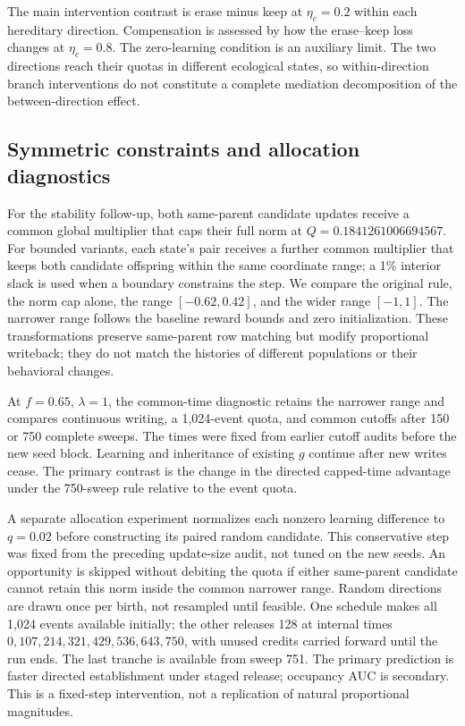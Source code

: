 \documentclass[11pt]{article}
\begin{document}
The main intervention contrast is erase minus keep at $\eta_c=0.2$ within each hereditary direction. Compensation is assessed by how the erase--keep loss changes at $\eta_c=0.8$. The zero-learning condition is an auxiliary limit. The two directions reach their quotas in different ecological states, so within-direction branch interventions do not constitute a complete mediation decomposition of the between-direction effect.

\subsection{Symmetric constraints and allocation diagnostics}
For the stability follow-up, both same-parent candidate updates receive a common global multiplier that caps their full norm at $Q=0.1841261006694567$. For bounded variants, each state's pair receives a further common multiplier that keeps both candidate offspring within the same coordinate range; a 1\% interior slack is used when a boundary constrains the step. We compare the original rule, the norm cap alone, the range $[-0.62,0.42]$, and the wider range $[-1,1]$. The narrower range follows the baseline reward bounds and zero initialization. These transformations preserve same-parent row matching but modify proportional writeback; they do not match the histories of different populations or their behavioral changes.

At $f=0.65$, $\lambda=1$, the common-time diagnostic retains the narrower range and compares continuous writing, a 1,024-event quota, and common cutoffs after 150 or 750 complete sweeps. The times were fixed from earlier cutoff audits before the new seed block. Learning and inheritance of existing $g$ continue after new writes cease. The primary contrast is the change in the directed capped-time advantage under the 750-sweep rule relative to the event quota.

A separate allocation experiment normalizes each nonzero learning difference to $q=0.02$ before constructing its paired random candidate. This conservative step was fixed from the preceding update-size audit, not tuned on the new seeds. An opportunity is skipped without debiting the quota if either same-parent candidate cannot retain this norm inside the common narrower range. Random directions are drawn once per birth, not resampled until feasible. One schedule makes all 1,024 events available initially; the other releases 128 at internal times $0,107,214,321,429,536,643,750$, with unused credits carried forward until the run ends. The last tranche is available from sweep 751. The primary prediction is faster directed establishment under staged release; occupancy AUC is secondary. This is a fixed-step intervention, not a replication of natural proportional magnitudes.
\end{document}
